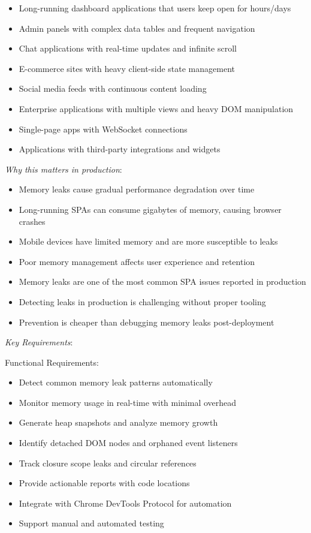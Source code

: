 \documentclass[11pt]{article}
\begin{document}
\begin{itemize}
\item Long-running dashboard applications that users keep open for hours/days
\item Admin panels with complex data tables and frequent navigation
\item Chat applications with real-time updates and infinite scroll
\item E-commerce sites with heavy client-side state management
\item Social media feeds with continuous content loading
\item Enterprise applications with multiple views and heavy DOM manipulation
\item Single-page apps with WebSocket connections
\item Applications with third-party integrations and widgets
\end{itemize}

\emph{Why this matters in production}:

\begin{itemize}
\item Memory leaks cause gradual performance degradation over time
\item Long-running SPAs can consume gigabytes of memory, causing browser crashes
\item Mobile devices have limited memory and are more susceptible to leaks
\item Poor memory management affects user experience and retention
\item Memory leaks are one of the most common SPA issues reported in production
\item Detecting leaks in production is challenging without proper tooling
\item Prevention is cheaper than debugging memory leaks post-deployment
\end{itemize}

\emph{Key Requirements}:

Functional Requirements:

\begin{itemize}
\item Detect common memory leak patterns automatically
\item Monitor memory usage in real-time with minimal overhead
\item Generate heap snapshots and analyze memory growth
\item Identify detached DOM nodes and orphaned event listeners
\item Track closure scope leaks and circular references
\item Provide actionable reports with code locations
\item Integrate with Chrome DevTools Protocol for automation
\item Support manual and automated testing
\end{itemize}
\end{document}
